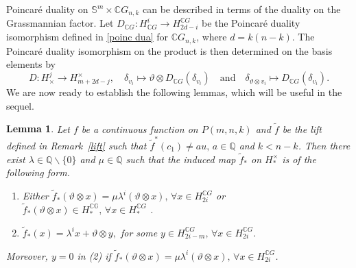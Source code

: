 \documentclass{amsart}
\newtheorem{lemma}[theorem]{Lemma}
\newcommand{\remref}[1]{Remark~\ref{#1}}
\begin{document}
		Poincar\'e duality %
on $\mathbb S^{m}\times \mathbb C G_{n,k}$ can be described in terms of the duality on the Grassmannian factor. Let 
		$D_{\mathbb C G}\colon H^{i}_{\mathbb C G}\to H_{2d-i}^{\mathbb C G}$ 
		be the Poincar\'e duality isomorphism defined in \eqref{poinc dua} for $\mathbb C G_{n,k}$, where $d=k(n-k)$.  
		The Poincar\'e duality isomorphism on the product
		is then determined on the basis elements by  
		\begin{equation}
			D\colon H^{j}_{\times}\to H_{m+2d-j}^{\times}, \quad \delta_{v_i}\mapsto \vartheta\otimes D_{\mathbb C G}(\delta_{v_i})\quad\text{and}\quad \delta_{\vartheta\otimes v_i} \mapsto D_{\mathbb C G}(\delta_{v_i}).
		\end{equation}
		We are now ready to %
establish the following lemmas, which %
will be useful in the sequel.
	\begin{lemma}\label{image of homf}
		Let $f$ be a continuous function on $P(m,n,k)$ and $\tilde{f}$ be the lift defined in \remref{lift} such that $\tilde{f}^*(c_1)\neq au,\, a\in \mathbb{Q}$ and $k<n-k$. Then there exist $\lambda \in \mathbb{Q}\backslash \{0\}$ and $\mu \in \mathbb{Q}$ such that the induced map $\tilde{f}_*$ on $H_*^{\times}$ is of the following %
form.
		\begin{enumerate}
			\item Either %
$\tilde{f}_*(\vartheta\otimes x) = \mu \lambda^i (\vartheta \otimes x),\, \forall x\in H_{2i}^{\mathbb{C}G}$ or $\tilde{f}_*(\vartheta\otimes x) \in H_*^{\mathbb{CG}},\, \forall x \in H_*^{\mathbb{C}G}$%
.
			\item $\tilde{f}_*(x) = \lambda^i x + \vartheta\otimes y,$ %
for some $y \in H_{2i-m}^{\mathbb{C}G}, \, \forall x \in H_{2i}^{\mathbb{C}G}.$
		\end{enumerate}
		Moreover, $y=0$ in \textit{(2)} if $\tilde{f}_*(\vartheta\otimes x) = \mu \lambda^i (\vartheta \otimes x),\, \forall x\in H_{2i}^{\mathbb{C}G}$.
	\end{lemma}
\end{document}
